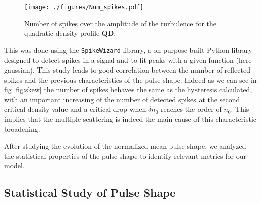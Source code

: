 \documentclass[11pt,openany]{report}
\begin{document}
\begin{multicols}{2}
    \setcounter{totalnumber}{50} %
    \setcounter{topnumber}{50}
    \setcounter{bottomnumber}{50}
    \setlength{\intextsep}{6pt}
    \begin{figure}
        \texttt{[image: ./figures/Num\_spikes.pdf]}
        \caption{Number of spikes over the amplitude of the turbulence for the quadratic density profile \textbf{QD}.}
    \end{figure}
    This was done using the \texttt{SpikeWizard} library, a on purpose built Python library designed to detect spikes in a signal and to fit peaks with a given function (here gaussian). This study leads to good correlation between the number of reflected spikes and the previous characteristics of the pulse shape. Indeed as we can see in fig \ref{fig:skew} the number of spikes behaves the same as the hysteresis calculated, with an important increasing of the number of detected spikes at the second critical density value and a critical drop when $\delta n_0$ reaches the order of $n_0$. This implies that the multiple scattering is indeed the main cause of this characteristic broadening.

    After studying the evolution of the normalized mean pulse shape, we analyzed the statistical properties of the pulse shape to identify relevant metrics for our model.


    \subsection{Statistical Study of Pulse Shape}





\end{multicols}
\end{document}
